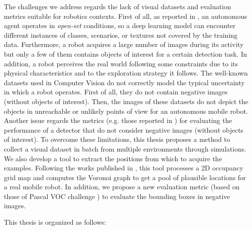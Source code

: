 The challenges we address regards the lack of visual datasets and evaluation metrics suitable for robotics contexts. First of all, as reported in \cite{surveydeeplimits}, an autonomous agent operates in \textit{open-set} conditions, so a deep learning model can encounter different instances of classes, scenarios, or textures not covered by the training data. Furthermore, a robot acquires a large number of images during its activity but only a few of them contains objects of interest for a certain detection task. In addition, a robot perceives the real world following some constraints due to its physical characteristics and to the exploration strategy it follows. The well-known datasets used in Computer Vision \cite{coco, imagenet, pascal} do not correctly model the typical uncertainty in which a robot operates. First of all, they do not contain negative images (without objects of interest). Then, the images of these datasets do not depict the objects in unreachable or unlikely points of view for an autonomous mobile robot. Another issue regards the metrics (e.g. those reported in \cite{pascal, generalizediou, coco}) for evaluating the performance of a detector that do not consider negative images (without objects of interest). To overcome these limitations, this thesis proposes a method to collect a visual dataset in batch from multiple environments through simulations. We also develop a tool to extract the positions from which to acquire the examples. Following the works published in \cite{repeatabilityslamarxiv, repeatabilityslam}, this tool processes a 2D occupancy grid map and computes the Voronoi graph to get a pool of plausible locations for a real mobile robot. In addition, we propose a new evaluation metric (based on those of Pascal VOC challenge \cite{pascal}) to evaluate the bounding boxes in negative images. 

This thesis is organized as follows:

